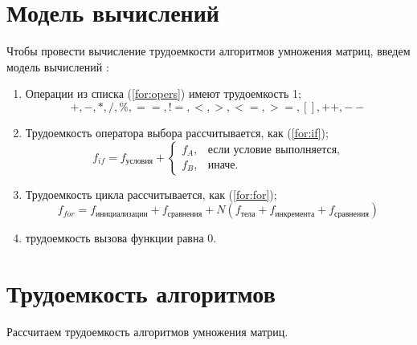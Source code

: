 
\clearpage


\section{Модель вычислений}

Чтобы провести вычисление трудоемкости алгоритмов умножения матриц, введем модель вычислений \cite{model}:

\begin{enumerate}
	\item Операции из списка (\ref{for:opers}) имеют трудоемкость 1;
	\begin{equation}
		\label{for:opers}
		+, -, *, /, \%, ==, !=, <, >, <=, >=, [], ++, {-}-
	\end{equation}
	\item Трудоемкость оператора выбора  рассчитывается, как (\ref{for:if});
	\begin{equation}
		\label{for:if}
		f_{if} = f_{\text{условия}} +
		\begin{cases}
			f_A, & \text{если условие выполняется,}\\
			f_B, & \text{иначе.}
		\end{cases}
	\end{equation}
	\item Трудоемкость цикла рассчитывается, как (\ref{for:for});
	\begin{equation}
		\label{for:for}
		f_{for} = f_{\text{инициализации}} + f_{\text{сравнения}} + N(f_{\text{тела}} + f_{\text{инкремента}} + f_{\text{сравнения}})
	\end{equation}
	\item трудоемкость вызова функции равна 0.
\end{enumerate}


\section{Трудоемкость алгоритмов}

Рассчитаем трудоемкость алгоритмов умножения матриц.

